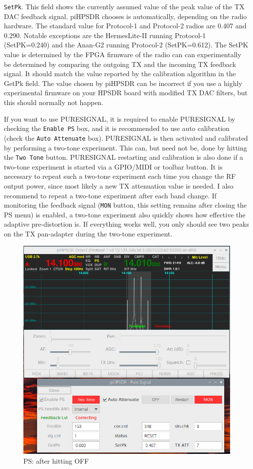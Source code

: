 \documentclass[12pt]{book}
\def\rett#1{\texttt{\color{red}#1}}
\def\pH{pi\-HPSDR }
\begin{document}
\rett{SetPk}. This field shows the currently assumed value of the peak value of the TX DAC
feedback signal. \pH chooses is automatically, depending on the radio hardware.
The standard value for Protocol-1 and Protocol-2 radios are 0.407 and 0.290. Notable exceptions are
the HermesLite-II running Protocol-1 (SetPK=0.240) and the Anan-G2 running Protocol-2 (SetPK=0.612).
The SetPK value is determined by the FPGA firmware of the radio can can experimentally
be determined by comparing the outgoing TX and the incoming TX feedback signal.
 It should match the value reported
by the calibration algorithm in the GetPk field. The  value
chosen by \pH can be incorrect if you use a highly experimental firmware on your
HPSDR board with modified TX DAC filters, but this should normally not happen.

If you want to use PURESIGNAL, it is required to enable PURESIGNAL by checking the
\rett{Enable PS} box, and it is recommended to use auto calibration (check the
\rett{Auto Attenuate} box). PURESIGNAL is then activated and calibrated by
performing a two-tone experiment. This can, but need not be, done by hitting
the \rett{Two Tone} button. PURESIGNAL restarting and calibration is also done
if a two-tone experiment is started via a GPIO/MIDI or toolbar button.
It is necessary to repeat such a two-tone experiment each time you change the
RF output power, since most likely a new TX attenuation value is needed. I also
recommend to repeat a two-tone experiment after each band change. If monitoring
the feedback signal (\rett{MON} button, this setting remains after closing the
PS menu) is enabled, a two-tone experiment also quickly shows how effective
the adaptive pre-distortion is. If everything works well, you only should see
two peaks on the TX pan-adapter during the two-tone experiment.

\begin{figure}[t!]
\center
\includegraphics[width=12cm]{PSoff.png}
\caption{PS: after hitting OFF}
\label{fig:PSoff}
\end{figure}
\end{document}

